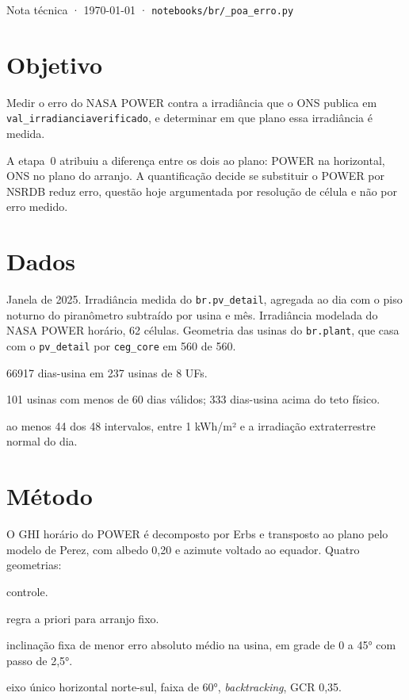 \documentclass[10pt,a4paper,oneside,twocolumn]{book}
\begin{document}
         {Nota técnica · \today{} ·
          \texttt{notebooks/br/\_poa\_erro.py}}

\section*{Objetivo}

Medir o erro do NASA POWER contra a irradiância que o ONS publica em
\texttt{val\_irradianciaverificado}, e determinar em que plano essa irradiância
é medida.

A etapa~0 atribuiu a diferença entre os dois ao plano: POWER na horizontal, ONS
no plano do arranjo. A quantificação decide se substituir o POWER por NSRDB
reduz erro, questão hoje argumentada por resolução de célula e não por erro
medido.

\section*{Dados}

Janela de 2025. Irradiância medida do \texttt{br.pv\_detail}, agregada ao dia
com o piso noturno do piranômetro subtraído por usina e mês. Irradiância
modelada do NASA POWER horário, 62 células. Geometria das usinas do
\texttt{br.plant}, que casa com o \texttt{pv\_detail} por \texttt{ceg\_core} em
560 de 560.

\begin{ficha}
  \item[Amostra]   \num{66917} dias-usina em 237 usinas de 8 UFs.
  \item[Descartes] 101 usinas com menos de 60 dias válidos; 333 dias-usina
                   acima do teto físico.
  \item[Dia]       ao menos 44 dos 48 intervalos, entre 1 kWh/m² e a
                   irradiação extraterrestre normal do dia.
\end{ficha}

\section*{Método}

O GHI horário do POWER é decomposto por Erbs e transposto ao plano pelo modelo
de Perez, com albedo 0,20 e azimute voltado ao equador. Quatro geometrias:

\begin{ficha}
  \item[0°]          controle.
  \item[$|$lat$|$]   regra a priori para arranjo fixo.
  \item[Ajustada]    inclinação fixa de menor erro absoluto médio na usina,
                     em grade de 0 a 45° com passo de 2,5°.
  \item[Rastreador]  eixo único horizontal norte-sul, faixa de 60°,
                     \textit{backtracking}, GCR 0,35.
\end{ficha}
\end{document}
